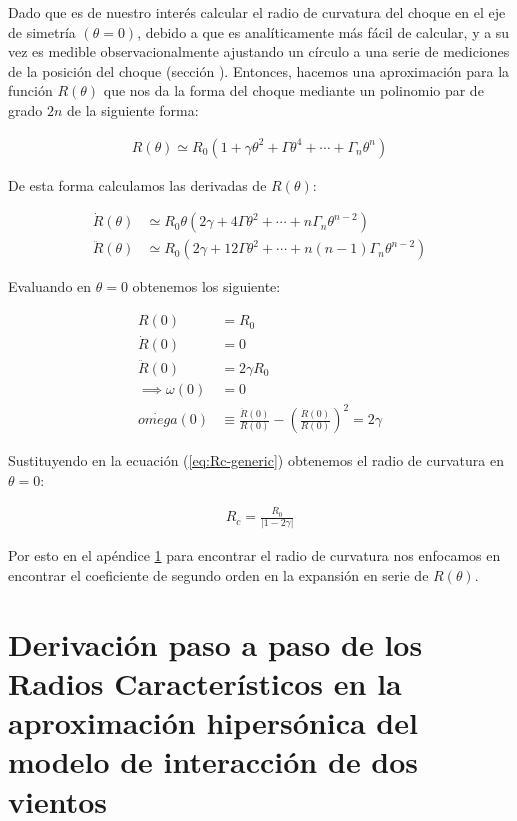 Dado que es de nuestro interés calcular el radio de curvatura del choque en el eje de simetría
$(\theta=0)$, debido a que es analíticamente más fácil de calcular, y a su vez es medible
observacionalmente ajustando un círculo a una serie de mediciones de la posición del choque (sección ).
Entonces, hacemos una aproximación para la función $R(\theta)$ que nos da la forma del choque
mediante un polinomio par de grado $2n$ de la siguiente forma:

\begin{align}
R(\theta) \simeq R_0\left(1 + \gamma\theta^2 + \Gamma\theta^4 + \cdots + \Gamma_n\theta^n\right)
\end{align}

De esta forma calculamos las derivadas de $R(\theta)$:

\begin{align}
  \dot{R}(\theta) &\simeq R_0\theta\left(2\gamma + 4\Gamma\theta^2 + \cdots + n\Gamma_n\theta^{n-2}\right) \\
  \ddot{R}(\theta) &\simeq R_0\left(2\gamma + 12\Gamma\theta^2 + \cdots + n(n-1)\Gamma_n\theta^{n-2}\right)
\end{align}

Evaluando en $\theta = 0$ obtenemos los siguiente:

\begin{align}
  R(0) &= R_0 \\
  \dot{R}(0) &= 0 \\
  \ddot{R}(0) &= 2\gamma R_0 \\
  \implies \omega(0) &= 0 \\
  \dot{omega}(0) &\equiv \frac{\ddot{R}(0)}{R(0)} - \left(\frac{\dot{R}(0)}{R(0)}\right)^2 = 2\gamma
\end{align}

Sustituyendo en la ecuación (\ref{eq:Rc-generic}) obtenemos el radio de curvatura en $\theta=0$:

\begin{align}
  R_c = \frac{R_0}{\left|1 - 2\gamma\right|}
\end{align}

Por esto en el apéndice \ref{app:dervation-radii} para encontrar el radio de curvatura nos enfocamos en encontrar
el coeficiente de segundo orden en la expansión en serie de $R(\theta)$.

\section{Derivación paso a paso de los Radios Característicos en la aproximación
  hipersónica del modelo de interacción de dos vientos}
\label{app:dervation-radii}

